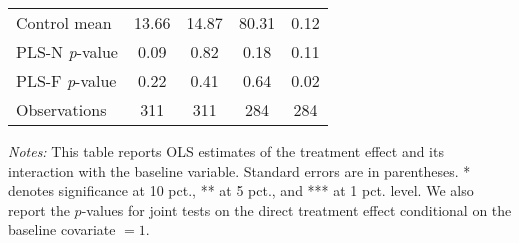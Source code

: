 \begin{table}[ht]
{\begin{threeparttable}
\begin{tabular}{l*{4}{c}}
Control mean    &    13.66         &    14.87         &    80.31         &     0.12         \\
PLS-N \emph{p}-value&     0.09         &     0.82         &     0.18         &     0.11         \\
PLS-F \emph{p}-value&     0.22         &     0.41         &     0.64         &     0.02         \\
Observations    &      311         &      311         &      284         &      284         \\
\bottomrule \end{tabular} \begin{tablenotes}[flushleft] \footnotesize \item \emph{Notes:} This table reports OLS estimates of the treatment effect and its interaction with the baseline variable. Standard errors are in parentheses. * denotes significance at 10 pct., ** at 5 pct., and *** at 1 pct. level. We also report the \(p\)-values for joint tests on the direct treatment effect conditional on the baseline covariate $= 1$. \end{tablenotes} \end{threeparttable} } \end{table}

